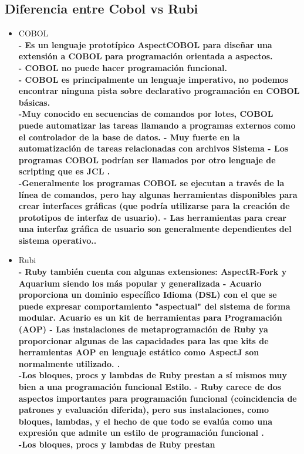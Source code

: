 \documentclass[twoside,twocolumn]{article}
\begin{document}
\subsection{Diferencia entre Cobol vs Rubi}
\begin{itemize}
\item COBOL
\\ \textbf{- Es un lenguaje prototípico AspectCOBOL para diseñar una extensión a COBOL para programación orientada a aspectos.}
\\ \textbf{- COBOL no puede hacer programación funcional.}
\\ \textbf{- COBOL es principalmente un lenguaje imperativo,
no podemos encontrar ninguna pista sobre declarativo
programación en COBOL básicas. }
\\ \textbf{-Muy conocido en secuencias de comandos por lotes, COBOL puede automatizar las tareas llamando a programas externos
como el controlador de la base de datos.
- Muy fuerte en la automatización de tareas relacionadas con archivos
Sistema
- Los programas COBOL podrían ser llamados por otro
lenguaje de scripting que es JCL
.}
\\ \textbf{-Generalmente los programas COBOL se ejecutan a través de
la línea de comandos, pero hay algunas herramientas
disponibles para crear interfaces gráficas (que
podría utilizarse para la creación de prototipos de interfaz de usuario).
- Las herramientas para crear una interfaz gráfica de usuario
son generalmente dependientes del sistema operativo..}
\item Rubi
\\ \textbf{- Ruby también cuenta con algunas extensiones:
AspectR-Fork y Aquarium siendo los más
popular y generalizada
- Acuario proporciona un dominio específico
Idioma (DSL) con el que se puede expresar
comportamiento "aspectual" del sistema de forma modular.
Acuario es un kit de herramientas para
Programación (AOP)
- Las instalaciones de metaprogramación de Ruby ya
proporcionar algunas de las capacidades para las que
kits de herramientas AOP en lenguaje estático como AspectJ son
normalmente utilizado. . }
\\ \textbf{-Los bloques, procs y lambdas de Ruby prestan
a sí mismos muy bien a una programación funcional
Estilo.
- Ruby carece de dos aspectos importantes para
programación funcional (coincidencia de patrones y
evaluación diferida), pero sus instalaciones, como
bloques, lambdas, y el hecho de que todo
se evalúa como una expresión que admite un
estilo de programación funcional
.}
\\ \textbf{-Los bloques, procs y lambdas de Ruby prestan
}
\end{itemize}
\end{document}
